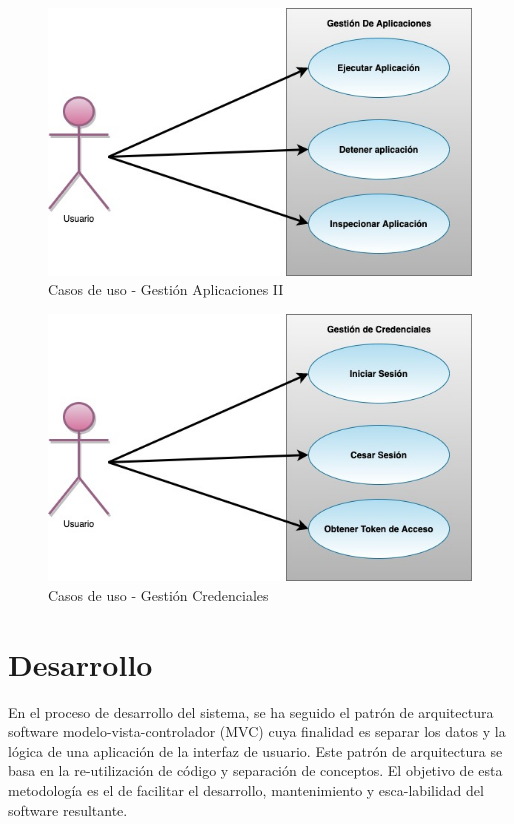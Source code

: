 \documentclass[a4paper,11pt]{book}
\begin{document}
\begin{figure}[H] 
\centering 
\includegraphics[scale=0.50]{imagenes/casosUso2.jpg}
\caption{ Casos de uso - Gestión Aplicaciones II\cite{diagrama}  }  
\end{figure}

\begin{figure}[H] 
\centering 
\includegraphics[scale=0.50]{imagenes/casosUso3.jpg}
\caption{ Casos de uso - Gestión Credenciales\cite{diagrama}  }  
\end{figure}


\section{Desarrollo}

En el proceso de desarrollo del sistema, se ha seguido el patrón de arquitectura software modelo-vista-controlador (MVC)\cite{mvc} cuya finalidad es separar los datos y la lógica de una aplicación de la interfaz de usuario. Este patrón de arquitectura se basa en la re-utilización de código y separación de conceptos. El objetivo de esta metodología es el de facilitar el desarrollo, mantenimiento y esca-labilidad del software resultante. 
\end{document}
